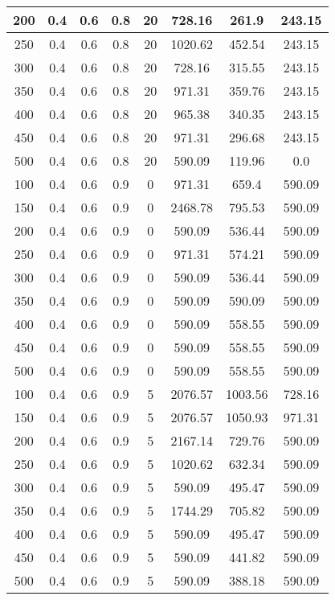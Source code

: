 \documentclass[a4paper, 12pt]{extreport}
\begin{document}
\begin{itemize}
\begin{longtable}{|c|c|c|c|c|c|c|c|}
			200 & 0.4 & 0.6 & 0.8 & 20 & 728.16 & 261.9 & 243.15 \\\hline
			250 & 0.4 & 0.6 & 0.8 & 20 & 1020.62 & 452.54 & 243.15 \\\hline
			300 & 0.4 & 0.6 & 0.8 & 20 & 728.16 & 315.55 & 243.15 \\\hline
			350 & 0.4 & 0.6 & 0.8 & 20 & 971.31 & 359.76 & 243.15 \\\hline
			400 & 0.4 & 0.6 & 0.8 & 20 & 965.38 & 340.35 & 243.15 \\\hline
			450 & 0.4 & 0.6 & 0.8 & 20 & 971.31 & 296.68 & 243.15 \\\hline
			500 & 0.4 & 0.6 & 0.8 & 20 & 590.09 & 119.96 & 0.0 \\\hline
			100 & 0.4 & 0.6 & 0.9 & 0 & 971.31 & 659.4 & 590.09 \\\hline
			150 & 0.4 & 0.6 & 0.9 & 0 & 2468.78 & 795.53 & 590.09 \\\hline
			200 & 0.4 & 0.6 & 0.9 & 0 & 590.09 & 536.44 & 590.09 \\\hline
			250 & 0.4 & 0.6 & 0.9 & 0 & 971.31 & 574.21 & 590.09 \\\hline
			300 & 0.4 & 0.6 & 0.9 & 0 & 590.09 & 536.44 & 590.09 \\\hline
			350 & 0.4 & 0.6 & 0.9 & 0 & 590.09 & 590.09 & 590.09 \\\hline
			400 & 0.4 & 0.6 & 0.9 & 0 & 590.09 & 558.55 & 590.09 \\\hline
			450 & 0.4 & 0.6 & 0.9 & 0 & 590.09 & 558.55 & 590.09 \\\hline
			500 & 0.4 & 0.6 & 0.9 & 0 & 590.09 & 558.55 & 590.09 \\\hline
			100 & 0.4 & 0.6 & 0.9 & 5 & 2076.57 & 1003.56 & 728.16 \\\hline
			150 & 0.4 & 0.6 & 0.9 & 5 & 2076.57 & 1050.93 & 971.31 \\\hline
			200 & 0.4 & 0.6 & 0.9 & 5 & 2167.14 & 729.76 & 590.09 \\\hline
			250 & 0.4 & 0.6 & 0.9 & 5 & 1020.62 & 632.34 & 590.09 \\\hline
			300 & 0.4 & 0.6 & 0.9 & 5 & 590.09 & 495.47 & 590.09 \\\hline
			350 & 0.4 & 0.6 & 0.9 & 5 & 1744.29 & 705.82 & 590.09 \\\hline
			400 & 0.4 & 0.6 & 0.9 & 5 & 590.09 & 495.47 & 590.09 \\\hline
			450 & 0.4 & 0.6 & 0.9 & 5 & 590.09 & 441.82 & 590.09 \\\hline
			500 & 0.4 & 0.6 & 0.9 & 5 & 590.09 & 388.18 & 590.09 \\\hline

\end{longtable}
\end{itemize}
\end{document}

